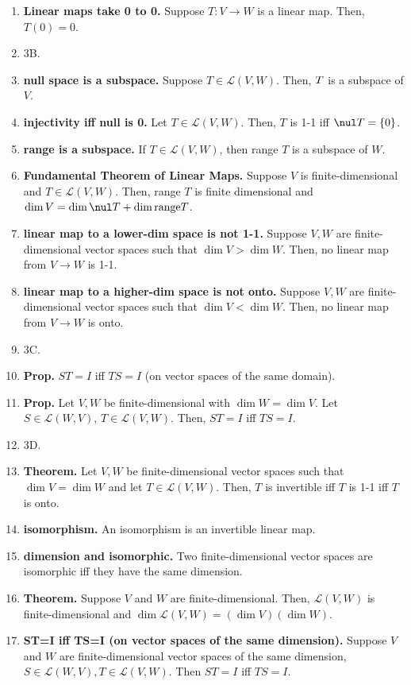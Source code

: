 \begin{enumerate}
	\item \textbf{Linear maps take 0 to 0. } Suppose $T: V \to W$ is a linear map. Then, $T(0)=0$. 
	\item 3B. 
	\item \textbf{null space is a subspace. } Suppose $T \in \mathscr{L}(V,W)$. Then, $\null T$ is a subspace of $V$. 
	\item \textbf{injectivity iff null is 0. } Let $T \in \mathscr{L}(V,W)$. Then, $T$ is 1-1 iff $\nul T = \{0\}$. 
	\item \textbf{range is a subspace. } If $T \in \mathscr{L}(V,W)$, then range $T$ is a subspace of $W$. 
	\item \textbf{Fundamental Theorem of Linear Maps. } Suppose $V$ is finite-dimensional and $T \in \mathscr{L}(V,W)$. Then, range $T$ is finite dimensional and $\dim V = \dim \nul T + \dim \textrm{range} T$. 
	\item \textbf{linear map to a lower-dim space is not 1-1. } Suppose $V,W$ are finite-dimensional vector spaces such that $\dim V > \dim W$. Then, no linear map from $V \to W$ is 1-1. 
	\item \textbf{linear map to a higher-dim space is not onto. } Suppose $V,W$ are finite-dimensional vector spaces such that $\dim V < \dim W$. Then, no linear map from $V \to W$ is onto. 
	\item 3C. 
	\item \textbf{Prop. } $ST=I$ iff $TS=I$ (on vector spaces of the same domain). 
	\item \textbf{Prop. } Let $V,W$ be finite-dimensional with $\dim W = \dim V$. Let $S \in \mathscr{L}(W,V)$, $T \in \mathscr{L}(V,W)$. Then, $ST=I$ iff $TS=I$. 
	\item 3D. 
	\item \textbf{Theorem. } Let $V,W$ be finite-dimensional vector spaces such that $\dim V = \dim W$ and let $T \in \mathscr{L}(V,W)$. Then, $T$ is invertible iff $T$ is 1-1 iff $T$ is onto. 
	\item \textbf{isomorphism. } An isomorphism is an invertible linear map. 
	\item \textbf{dimension and isomorphic. } Two finite-dimensional vector spaces are isomorphic iff they have the same dimension. 
	\item \textbf{Theorem. } Suppose $V$ and $W$ are finite-dimensional. Then, $\mathscr{L}(V,W)$ is finite-dimensional and $\dim \mathscr{L}(V,W) = (\dim V)(\dim W)$.
	\item \textbf{ST=I iff TS=I (on vector spaces of the same dimension). } Suppose $V$ and $W$ are finite-dimensional vector spaces of the same dimension, $S \in \mathscr{L}(W,V), T \in \mathscr{L}(V,W)$. Then $ST=I$ iff $TS=I$. 

\end{enumerate}
